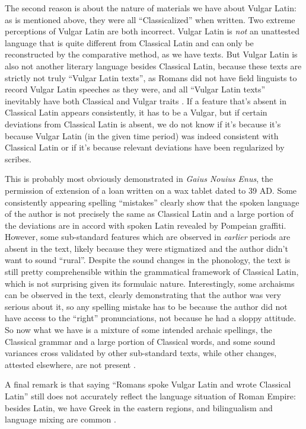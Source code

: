 \documentclass[a4paper, oneside, 12pt]{report}
\newcommand*{\citesec}[1]{\S~{#1}}
\newcommand*{\citepages}[1]{pp.~{#1}}
\newcommand{\literature}[1]{\textit{#1}}
\begin{document}
The second reason is about the nature of materials we have about Vulgar Latin:
as is mentioned above, they were all ``Classicalized'' when written.
Two extreme perceptions of Vulgar Latin are both incorrect.
Vulgar Latin is \emph{not} an unattested language
that is quite different from Classical Latin and can only be reconstructed by the comparative method,
as we have texts.
But Vulgar Latin is also not another literary language besides Classical Latin, 
because these texts are strictly not truly ``Vulgar Latin texts'',
as Romans did not have field linguists to record Vulgar Latin speeches as they were,
and all ``Vulgar Latin texts'' inevitably have both Classical and Vulgar traits
\citep[\citepages{8,26}]{herman2010vulgar}.
If a feature that's absent in Classical Latin appears consistently,
it has to be a Vulgar,
but if certain deviations from Classical Latin is absent,
we do not know if it's because it's because Vulgar Latin (in the given time period)
was indeed consistent with Classical Latin
or if it's because relevant deviations have been regularized by scribes.

This is probably most obviously demonstrated in \literature{Gaius Nouius Enus},
the permission of extension of a loan written on a wax tablet dated to 39 AD.
Some consistently appearing spelling ``mistakes'' clearly show that
the spoken language of the author is not precisely the same as Classical Latin
and a large portion of the deviations are in accord with spoken Latin revealed by Pompeian graffiti.
However, some sub-standard features which are observed in \emph{earlier} periods
are absent in the text,
likely because they were stigmatized and the author didn't want to sound ``rural''.
Despite the sound changes in the phonology,
the text is still pretty comprehensible within the grammatical framework of Classical Latin,
which is not surprising given its formulaic nature.
Interestingly, some archaisms can be observed in the text,
clearly demonstrating that the author was very serious about it,
so any spelling mistake has to be because 
the author did not have access to the ``right'' pronunciations,
not because he had a sloppy attitude.
So now what we have is a mixture of some intended archaic spellings,
the Classical grammar and a large portion of Classical words,
and some sound variances cross validated by other sub-standard texts,
while other changes, attested elsewhere, are not present
\citep[\citesec{7.4.1}]{clackson2011blackwell}.

A final remark is that 
saying ``Romans spoke Vulgar Latin and wrote Classical Latin'' 
still does not accurately reflect the language situation of Roman Empire:
besides Latin, we have Greek in the eastern regions,
and bilingualism and language mixing are common
\citep[\citesec{7.2}]{clackson2011blackwell}.
\end{document}
